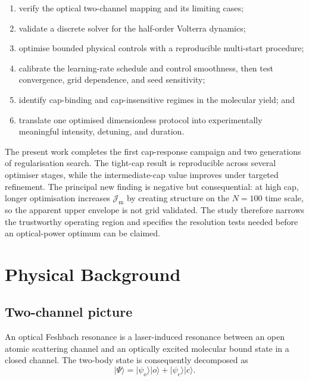 \documentclass[9pt,a4paper,twocolumn,twoside]{rho-class/rho}
\newcommand{\Jmol}{\mathcal{J}_{\mathrm{m}}}
\begin{document}
        \begin{enumerate}
            \item verify the optical two-channel mapping and its limiting cases;
            \item validate a discrete solver for the half-order Volterra dynamics;
            \item optimise bounded physical controls with a reproducible multi-start procedure;
            \item calibrate the learning-rate schedule and control smoothness, then test convergence, grid dependence, and seed sensitivity;
            \item identify cap-binding and cap-insensitive regimes in the molecular yield; and
            \item translate one optimised dimensionless protocol into experimentally meaningful intensity, detuning, and duration.
        \end{enumerate}

        The present work completes the first cap-response campaign and two generations of regularisation search. The tight-cap result is reproducible across several optimiser stages, while the intermediate-cap value improves under targeted refinement. The principal new finding is negative but consequential: at high cap, longer optimisation increases $\Jmol$ by creating structure on the $N=100$ time scale, so the apparent upper envelope is not grid validated. The study therefore narrows the trustworthy operating region and specifies the resolution tests needed before an optical-power optimum can be claimed.

\section{Physical Background}\label{sec:background}

    \subsection{Two-channel picture}

        An optical Feshbach resonance is a laser-induced resonance between an open atomic scattering channel and an optically excited molecular bound state in a closed channel. The two-body state is consequently decomposed as
        \begin{equation}\label{eq:two-channel-state}
            \lvert\Psi\rangle
            =\lvert\psi_o\rangle\lvert o\rangle
            +\lvert\psi_c\rangle\lvert c\rangle.
        \end{equation}
\end{document}
